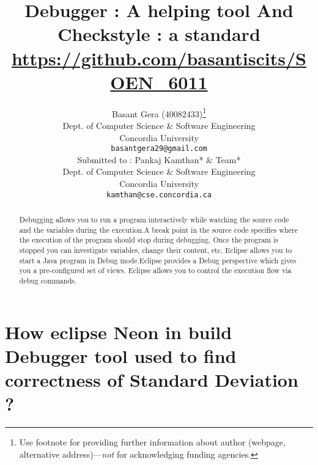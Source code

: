 \documentclass{article}
\title{Debugger : A helping tool And  Checkstyle : a standard\\ \url{ https://github.com/basantiscits/SOEN\_6011}}
\author{
  Basant Gera (40082433)\thanks{Use footnote for providing further
    information about author (webpage, alternative
    address)---\emph{not} for acknowledging funding agencies.} \\
  Dept. of Computer Science \& Software Engineering\\
  Concordia University\\
  \texttt{basantgera29@gmail.com} \\
   \And
Submitted to : Pankaj Kamthan* \& Team*\\
   Dept. of Computer Science \& Software Engineering\\
  Concordia University\\
  \texttt{kamthan@cse.concordia.ca} \\
}
\begin{document}
\maketitle

\begin{abstract}
Debugging allows you to run a program interactively while watching the source code and the variables during the execution.A break point in the source code specifies where the execution of the program should stop during debugging. Once the program is stopped you can investigate variables, change their content, etc. Eclipse allows you to start a Java program in Debug mode.Eclipse provides a Debug perspective which gives you a pre-configured set of views. Eclipse allows you to control the execution flow via debug commands.
\end{abstract}

\section{ How eclipse Neon in build Debugger tool used to find correctness of Standard Deviation ?}
\end{document}

